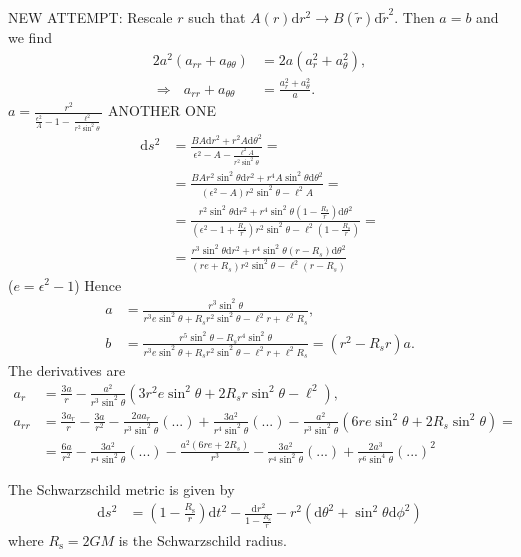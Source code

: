 \documentclass[english, parskip=full]{scrartcl}
\newcommand{\kla}{}
\newcommand{\tecxt}{}
\begin{document}
NEW ATTEMPT:
Rescale $r$ such that $A(r) \tecxt\text{d}r^2 \rightarrow B(\tilde{r}) \tecxt\text{d}\tilde{r}^2$.
Then $a=b$ and we find
\begin{align}
2a^2 (a_{rr} + a_{\theta\theta}) &= 2a(a_r^2 + a_\theta^2),\\
\Rightarrow\ \ \ a_{rr} + a_{\theta\theta} &= \frac{a_r^2 + a_\theta^2}{a}.
\end{align}
$a=\frac{r^2}{\frac{\epsilon^2}{A} - 1 - \frac{\ell^2}{r^2\sin^2\theta}}$ 
ANOTHER ONE
\begin{align}
\tecxt\text{d}s^2 &= \frac{BA\tecxt\text{d}r^2 + r^2A\tecxt\text{d}\theta^2}{\epsilon^2 - A - \frac{\ell^2A}{r^2\sin^2\theta}} = \\
&= \frac{BAr^2\sin^2\theta \tecxt\text{d}r^2 + r^4A\sin^2\theta \tecxt\text{d}\theta^2}{(\epsilon^2 - A) r^2\sin^2\theta - \ell^2A} = \\
&= \frac{r^2\sin^2\theta \tecxt\text{d}r^2 + r^4\sin^2\theta \kla\left( 1 - \frac{R_s}{r} \right) \tecxt\text{d}\theta^2}{ \kla\left( \epsilon^2 - 1 + \frac{R_s}{r} \right) r^2\sin^2\theta - \ell^2 \kla\left( 1 - \frac{R_s}{r} \right)} = \\
&= \frac{r^3\sin^2\theta \tecxt\text{d}r^2 + r^4\sin^2\theta (r-R_s) \tecxt\text{d}\theta^2}{(re + R_s)r^2\sin^2\theta - \ell^2(r - R_s)}
\end{align}
($e = \epsilon^2 - 1$)
Hence
\begin{align}
a &= \frac{r^3\sin^2\theta}{r^3e\sin^2\theta + R_sr^2\sin^2\theta - \ell^2r + \ell^2R_s},\\
b &= \frac{r^5\sin^2\theta - R_sr^4\sin^2\theta}{r^3e\sin^2\theta + R_sr^2\sin^2\theta - \ell^2r + \ell^2R_s} = (r^2-R_sr) a .
\end{align}
The derivatives are
\begin{align}
a_r &= \frac{3a}{r} - \frac{a^2}{r^3\sin^2\theta}  \kla\left( 3r^2e\sin^2\theta + 2R_sr\sin^2\theta - \ell^2 \right),\\
a_{rr} &= \frac{3a_r}{r} - \frac{3a}{r^2} - \frac{2aa_r}{r^3\sin^2\theta} (...) + \frac{3a^2}{r^4\sin^2\theta} (...) - \frac{a^2}{r^3\sin^2\theta} \kla\left( 6re\sin^2\theta + 2R_s\sin^2\theta \right) = \\
&= \frac{6a}{r^2} - \frac{3a^2}{r^4\sin^2\theta} (...) - \frac{a^2 (6re + 2R_s)}{r^3} - \frac{3a^2}{r^4\sin^2\theta} (...) + \frac{2a^3}{r^6\sin^4\theta} (...)^2
\end{align}

The Schwarzschild metric is given by
\begin{align}
\tecxt\text{d}s^2 &= \kla\left( 1 - \frac{R_\text{s}}{r} \right) \tecxt\text{d}t^2 - \frac{\tecxt\text{d}r^2}{1 - \frac{R_\tecxt\text{s}}{r}} - r^2\kla\left( \tecxt\text{d}\theta^2 + \sin^2\theta \tecxt\text{d}\phi^2 \right)
\end{align}
where $R_\tecxt\text{s} = 2GM$ is the Schwarzschild radius.
\end{document}
